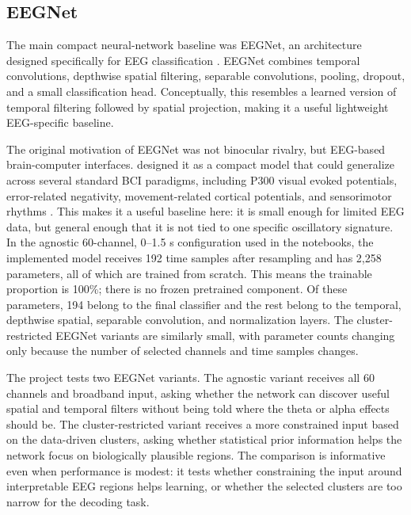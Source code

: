 \documentclass[11pt,a4paper,chapterprefix=false,parskip=false]{scrreprt}
\begin{document}
\subsection{EEGNet}
The main compact neural-network baseline was EEGNet, an architecture designed specifically for EEG classification \citep{lawhern_eegnet_2018}. EEGNet combines temporal convolutions, depthwise spatial filtering, separable convolutions, pooling, dropout, and a small classification head. Conceptually, this resembles a learned version of temporal filtering followed by spatial projection, making it a useful lightweight EEG-specific baseline.

The original motivation of EEGNet was not binocular rivalry, but EEG-based brain-computer interfaces. \citeauthor{lawhern_eegnet_2018} designed it as a compact model that could generalize across several standard BCI paradigms, including P300 visual evoked potentials, error-related negativity, movement-related cortical potentials, and sensorimotor rhythms \citep{lawhern_eegnet_2018}. This makes it a useful baseline here: it is small enough for limited EEG data, but general enough that it is not tied to one specific oscillatory signature. In the agnostic 60-channel, 0--1.5 s configuration used in the notebooks, the implemented model receives 192 time samples after resampling and has 2,258 parameters, all of which are trained from scratch. This means the trainable proportion is 100\%; there is no frozen pretrained component. Of these parameters, 194 belong to the final classifier and the rest belong to the temporal, depthwise spatial, separable convolution, and normalization layers. The cluster-restricted EEGNet variants are similarly small, with parameter counts changing only because the number of selected channels and time samples changes.

The project tests two EEGNet variants. The agnostic variant receives all 60 channels and broadband input, asking whether the network can discover useful spatial and temporal filters without being told where the theta or alpha effects should be. The cluster-restricted variant receives a more constrained input based on the data-driven clusters, asking whether statistical prior information helps the network focus on biologically plausible regions. The comparison is informative even when performance is modest: it tests whether constraining the input around interpretable EEG regions helps learning, or whether the selected clusters are too narrow for the decoding task.
\end{document}
